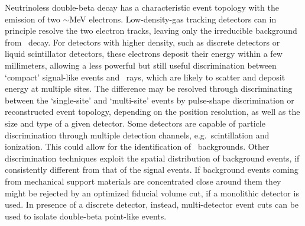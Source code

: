 Neutrinoless double-beta decay has a characteristic event topology with the emission of
two $\sim$MeV electrons. Low-density-gas tracking detectors can in principle resolve the
two electron tracks, leaving only the irreducible background from \nnbb\ decay. For
detectors with higher density, such as discrete detectors or liquid scintillator
detectors, these electrons deposit their energy within a few millimeters, allowing a less
powerful but still useful discrimination between `compact' signal-like events and \g\
rays, which are likely to scatter and deposit energy at multiple sites. The difference may
be resolved through discriminating between the `single-site' and `multi-site' events by
pulse-shape discrimination or reconstructed event topology, depending on the position
resolution, as well as the size and type of a given detector.  Some detectors are capable
of particle discrimination through multiple detection channels, e.g.~scintillation and
ionization. This could allow for the identification of \a\ backgrounds. Other
discrimination techniques exploit the spatial distribution of background events, if
consistently different from that of the signal events. If background events coming from
mechanical support materials are concentrated close around them they might be rejected by
an optimized fiducial volume cut, if a monolithic detector is used. In presence of a
discrete detector, instead, multi-detector event cuts can be used to isolate double-beta
point-like events.

